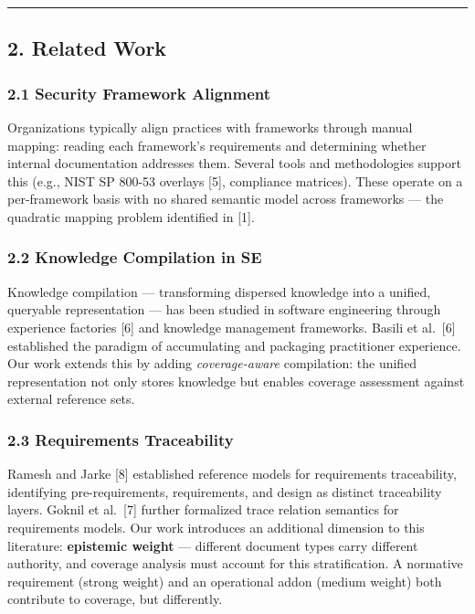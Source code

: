 \documentclass[
]{article}
\begin{document}
\begin{center}\rule{0.5\linewidth}{0.5pt}\end{center}

\subsection{2. Related Work}\label{related-work}

\subsubsection{2.1 Security Framework
Alignment}\label{security-framework-alignment}

Organizations typically align practices with frameworks through manual
mapping: reading each framework's requirements and determining whether
internal documentation addresses them. Several tools and methodologies
support this (e.g., NIST SP 800-53 overlays {[}5{]}, compliance
matrices). These operate on a per-framework basis with no shared
semantic model across frameworks --- the quadratic mapping problem
identified in {[}1{]}.

\subsubsection{2.2 Knowledge Compilation in
SE}\label{knowledge-compilation-in-se}

Knowledge compilation --- transforming dispersed knowledge into a
unified, queryable representation --- has been studied in software
engineering through experience factories {[}6{]} and knowledge
management frameworks. Basili et al.~{[}6{]} established the paradigm of
accumulating and packaging practitioner experience. Our work extends
this by adding \emph{coverage-aware} compilation: the unified
representation not only stores knowledge but enables coverage assessment
against external reference sets.

\subsubsection{2.3 Requirements
Traceability}\label{requirements-traceability}

Ramesh and Jarke {[}8{]} established reference models for requirements
traceability, identifying pre-requirements, requirements, and design as
distinct traceability layers. Goknil et al.~{[}7{]} further formalized
trace relation semantics for requirements models. Our work introduces an
additional dimension to this literature: \textbf{epistemic weight} ---
different document types carry different authority, and coverage
analysis must account for this stratification. A normative requirement
(strong weight) and an operational addon (medium weight) both contribute
to coverage, but differently.
\end{document}
